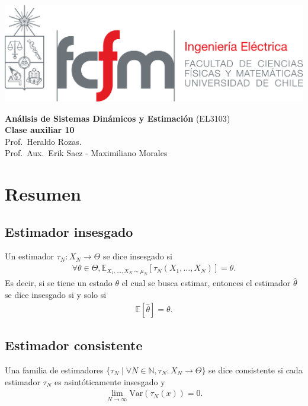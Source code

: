 \documentclass[
  11pt,
  letterpaper,
   addpoints,
  ]{exam}
\begin{document}
\noindent
\begin{minipage}{0.47\textwidth}
\includegraphics[width=\textwidth]{../fcfm_die}
\end{minipage}
\begin{minipage}{0.53\textwidth}
\begin{center} 
\large\textbf{Análisis de Sistemas Dinámicos y Estimación} (EL3103) \\
\large\textbf{Clase auxiliar 10} \\
\normalsize Prof.~Heraldo Rozas.\\
\normalsize Prof.~Aux.~Erik Saez - Maximiliano Morales
\end{center}
\end{minipage}

\vspace{0.5cm}
\noindent
\vspace{.85cm}
\section{Resumen}
\subsection*{Estimador insesgado}
Un estimador $\tau_N : X_N \to \Theta$ se dice insesgado si 
\begin{align}
\forall \theta \in \Theta, \mathbb{E}_{X_1, \dots, X_N \sim \mu_N} \left[\tau_N(X_1, \dots, X_N)\right] = \theta.
\end{align}
Es decir, si se tiene un estado $\theta$ el cual se busca estimar, entonces el estimador $\hat{\theta}$ se dice insesgado si y solo si
\begin{align}
\mathbb{E}\left[\hat{\theta}\right] = \theta.
\end{align}

\subsection*{Estimador consistente}
Una familia de estimadores $\{\tau_N \mid \forall N \in \mathbb{N}, \tau_N : X_N \to \Theta \}$ se dice consistente si cada estimador $\tau_N$ es asintóticamente insesgado y
\begin{align}
\lim_{N \to \infty} \text{Var}(\tau_N(x)) = 0.
\end{align}
\end{document}
